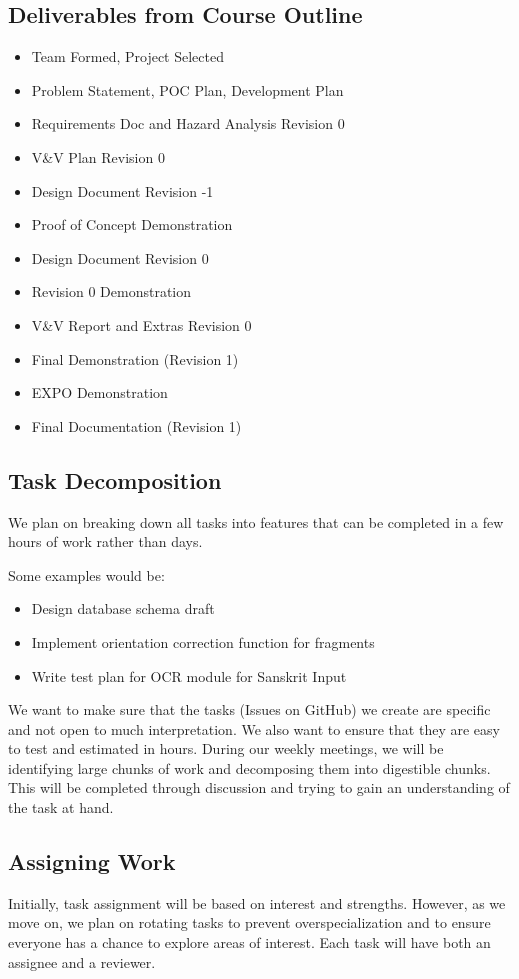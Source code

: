 \documentclass{article}
\begin{document}
\subsection*{Deliverables from Course Outline}
\begin{itemize}
    \item Team Formed, Project Selected
    \item Problem Statement, POC Plan, Development Plan
    \item Requirements Doc and Hazard Analysis Revision 0
    \item V\&V Plan Revision 0
    \item Design Document Revision -1
    \item Proof of Concept Demonstration
    \item Design Document Revision 0
    \item Revision 0 Demonstration
    \item V\&V Report and Extras Revision 0
    \item Final Demonstration (Revision 1)
    \item EXPO Demonstration
    \item Final Documentation (Revision 1)
\end{itemize}

\subsection*{Task Decomposition}
We plan on breaking down all tasks into features that can be completed in a few hours of work rather than days.

Some examples would be:
\begin{itemize}
    \item Design database schema draft
    \item Implement orientation correction function for fragments
    \item Write test plan for OCR module for Sanskrit Input
\end{itemize}

\noindent
We want to make sure that the tasks (Issues on GitHub) we create are specific and not open to much interpretation. We also want to ensure that they are easy to test and estimated in hours. During our weekly meetings, we will be identifying large chunks of work and decomposing them into digestible chunks. This will be completed through discussion and trying to gain an understanding of the task at hand.

\subsection*{Assigning Work}
Initially, task assignment will be based on interest and strengths. However, as we move on, we plan on rotating tasks to prevent overspecialization and to ensure everyone has a chance to explore areas of interest. Each task will have both an assignee and a reviewer.
\end{document}
